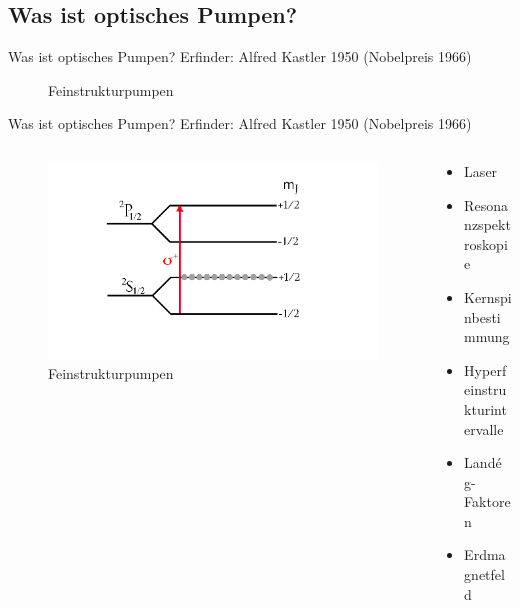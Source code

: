 \documentclass{beamer}
\begin{document}

\subsection{Was ist optisches Pumpen?}

\begin{frame}{Was ist optisches Pumpen?}
Erfinder: Alfred Kastler 1950 (Nobelpreis 1966)
	\begin{figure}[H]
	\caption{Feinstrukturpumpen}
	\end{figure}
\end{frame}


\begin{frame}{Was ist optisches Pumpen?}
Erfinder: Alfred Kastler 1950 (Nobelpreis 1966)
\begin{columns}
\begin{column}{5cm}
	\begin{figure}[H]
	\includegraphics[width = \textwidth]{Movies/animation2197.png}
	\caption{Feinstrukturpumpen}
	\end{figure}
\end{column}
\begin{column}{5cm}
	\begin{itemize}
	 \item Laser
	 \item Resonanzspektroskopie
	 \item Kernspinbestimmung
	 \item Hyperfeinstrukturintervalle
	 \item Landé g-Faktoren
	 \item Erdmagnetfeld
	\end{itemize}
\end{column}
\end{columns}
\end{frame}
\end{document}
